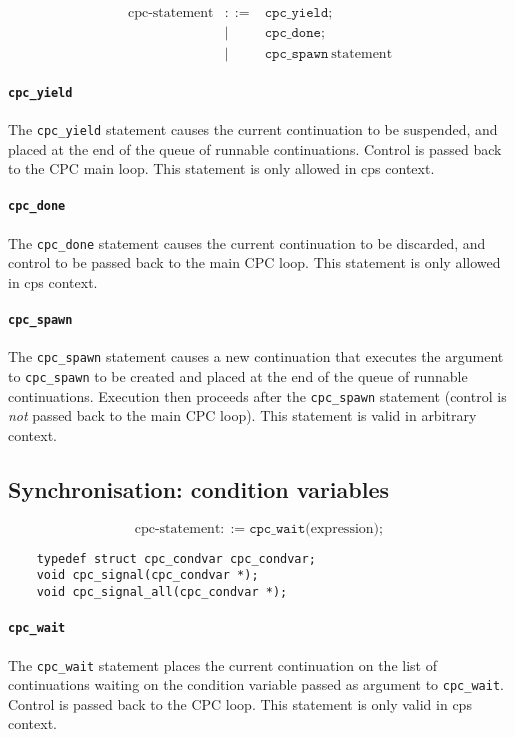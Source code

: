\documentclass[a4paper]{report}
\begin{document}
\begin{eqnarray*}
\mbox{cpc-statement} & ::= & 
     \mathtt{cpc\_yield} \mathtt{;} \\
 &|& \mathtt{cpc\_done} \mathtt{;} \\
 &|& \mathtt{cpc\_spawn}\ \mbox{statement}
\end{eqnarray*}

\paragraph{\tt cpc\_yield} The {\tt cpc\_yield} statement causes the
current continuation to be suspended, and placed at the end of the
queue of runnable continuations.  Control is passed back to the CPC
main loop.  This statement is only allowed in cps context.

\paragraph{\tt cpc\_done} The {\tt cpc\_done} statement causes the
current continuation to be discarded, and control to be passed back to
the main CPC loop.  This statement is only allowed in cps context.

\paragraph{\tt cpc\_spawn} The {\tt cpc\_spawn} statement causes a new
continuation that executes the argument to {\tt cpc\_spawn} to be
created and placed at the end of the queue of runnable continuations.
Execution then proceeds after the {\tt cpc\_spawn} statement (control
is {\em not\/} passed back to the main CPC loop).  This statement is
valid in arbitrary context.

\subsection{Synchronisation: condition variables}

\[ \mbox{cpc-statement} ::=
   \mathtt{cpc\_wait} \mathtt{(} \mbox{expression} \mathtt{)} \mathtt{;} \]

\begin{verbatim}
    typedef struct cpc_condvar cpc_condvar;
    void cpc_signal(cpc_condvar *);
    void cpc_signal_all(cpc_condvar *);
\end{verbatim}

\paragraph{\tt cpc\_wait} The {\tt cpc\_wait} statement places the
current continuation on the list of continuations waiting on the
condition variable passed as argument to {\tt cpc\_wait}.  Control is
passed back to the CPC loop.  This statement is only valid in cps
context.
\end{document}
